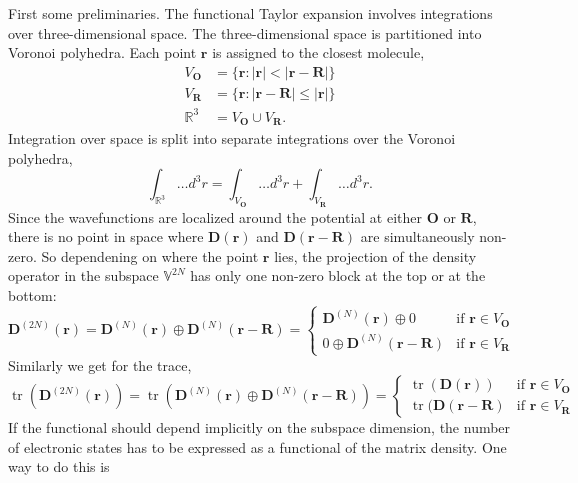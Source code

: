 \documentclass[journal=jpclcd,manuscript=letter]{achemso}
\DeclareMathOperator{\tr}{tr}
\newcommand\m[1]{\mathbf{#1}}
\renewcommand\vec[1]{\mathbf{#1}}
\begin{document}
First some preliminaries.
The functional Taylor expansion involves integrations over three-dimensional space.
The three-dimensional space is partitioned into Voronoi polyhedra. Each point $\vec{r}$ is assigned to the closest molecule,
\begin{align}
  V_{\vec{O}} &= \{\vec{r}: \vert \vec{r} \vert < \vert \vec{r} - \vec{R} \vert \} \\
  V_{\vec{R}} &= \{\vec{r}: \vert \vec{r} - \vec{R} \vert \leq \vert \vec{r} \vert \} \\
  \mathbb{R}^3 &= V_{\vec{O}} \cup V_{\vec{R}}.
\end{align}
Integration over space is split into separate integrations over the Voronoi polyhedra,
\begin{equation}
 \int_{\mathbb{R}^3} \ldots d^3\!r = \int_{V_{\vec{O}}} \ldots d^3\!r + \int_{V_{\vec{R}}} \ldots d^3\!r.
\end{equation}
Since the wavefunctions are localized around the potential at either $\vec{O}$ or $\vec{R}$, there is no point in space where $\m{D}(\vec{r})$ and $\m{D}(\vec{r}-\vec{R})$ are simultaneously non-zero. So dependening on where the point $\vec{r}$ lies, the projection of the density operator in the subspace $\mathbb{V}^{2N}$ has only one non-zero block at the top or at the bottom:
\begin{equation}
  \m{D}^{(2N)}(\vec{r}) = \m{D}^{(N)}(\vec{r}) \oplus \m{D}^{(N)}(\vec{r}-\vec{R}) =
  \begin{cases}
    \m{D}^{(N)}(\vec{r}) \oplus 0 & \text{if } \vec{r} \in V_{\vec{O}} \\
    0 \oplus \m{D}^{(N)}(\vec{r}-\vec{R}) & \text{if } \vec{r} \in V_{\vec{R}} \label{eqn:D_split}
  \end{cases}
\end{equation}
Similarly we get for the trace,
\begin{equation}
  \tr\left(\m{D}^{(2N)}(\vec{r}) \right)
  =
  \tr\left(\m{D}^{(N)}(\vec{r}) \oplus \m{D}^{(N)}(\vec{r}-\vec{R}) \right)
  =
  \begin{cases}
    \tr(\m{D}(\vec{r})) & \text{if } \vec{r} \in V_{\vec{O}} \\
    \tr(\m{D}(\vec{r}-\vec{R}) & \text{if } \vec{r} \in V_{\vec{R}} \label{eqn:tr_split}
  \end{cases}
\end{equation}
If the functional should depend implicitly on the subspace dimension, the number of electronic states has to be expressed as a functional of the matrix density. One way to do this is
\end{document}
